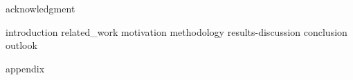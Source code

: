 \documentclass[paper=a4,twoside=true,fontsize=11pt,numbers=noendperiod,chapterprefix=false]{scrbook}
\begin{document}
{acknowledgment}

\tableofcontents
\cleardoublepage

\listoffigures
{}
\cleardoublepage

\listoftables
{}
\cleardoublepage

\renewcommand*{\chapterpagestyle}{mychapterpagestyle}
\renewcommand*{\chapterformat}{} %

{introduction}
{related_work}
{motivation}
{methodology}
{results-discussion}
{conclusion}
{outlook}



\appendix
\clearpage
\renewcommand*{\chapterpagestyle}{myappendixpagestyle}
{appendix}

\clearpage
\renewcommand*{\chapterpagestyle}{empty}

\end{document}
